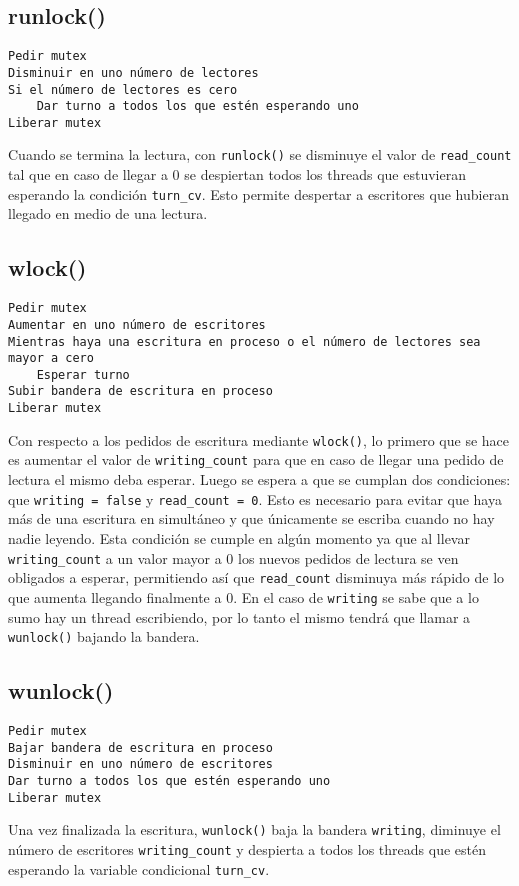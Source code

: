 \documentclass[a4paper]{article}
\begin{document}
\subsection*{runlock()}
\begin{codesnippet}
\begin{verbatim}
Pedir mutex
Disminuir en uno número de lectores
Si el número de lectores es cero
    Dar turno a todos los que estén esperando uno
Liberar mutex
\end{verbatim}
\end{codesnippet}

Cuando se termina la lectura, con \texttt{runlock()} se disminuye el
valor de \texttt{read\_count} tal que en caso de llegar a 0 se despiertan
todos los threads que estuvieran esperando la condición \texttt{turn\_cv}. Esto
permite despertar a escritores que hubieran llegado en medio de una lectura.

\subsection*{wlock()}
\begin{codesnippet}
\begin{verbatim}
Pedir mutex
Aumentar en uno número de escritores
Mientras haya una escritura en proceso o el número de lectores sea mayor a cero
    Esperar turno
Subir bandera de escritura en proceso
Liberar mutex
\end{verbatim}
\end{codesnippet}

Con respecto a los pedidos de escritura mediante \texttt{wlock()}, lo primero
que se hace es aumentar el valor de \texttt{writing\_count} para que en caso de
llegar una pedido de lectura el mismo deba esperar. Luego se espera a que se
cumplan dos condiciones: que \texttt{writing = false} y \texttt{read\_count =
0}. Esto es necesario para evitar que haya más de una escritura en simultáneo y
que únicamente se escriba cuando no hay nadie leyendo. Esta condición se cumple
en algún momento ya que al llevar \texttt{writing\_count} a un valor mayor a 0 los
nuevos pedidos de lectura se ven obligados a esperar, permitiendo así que
\texttt{read\_count} disminuya más rápido de lo que aumenta llegando finalmente
a 0. En el caso de \texttt{writing} se sabe que a lo sumo hay un thread
escribiendo, por lo tanto el mismo tendrá que llamar a \texttt{wunlock()}
bajando la bandera.

\subsection*{wunlock()}
\begin{codesnippet}
\begin{verbatim}
Pedir mutex
Bajar bandera de escritura en proceso
Disminuir en uno número de escritores
Dar turno a todos los que estén esperando uno
Liberar mutex
\end{verbatim}
\end{codesnippet}
Una vez finalizada la escritura, \texttt{wunlock()} baja la bandera
\texttt{writing}, diminuye el número de escritores \texttt{writing\_count} y
despierta a todos los threads que estén esperando la variable condicional
\texttt{turn\_cv}.
\end{document}
